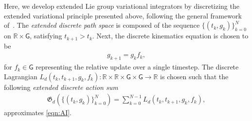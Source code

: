 \documentclass[letterpaper, 10pt, conference]{ieeeconf}
\newcommand{\G}{\ensuremath{\mathsf{G}}}
\renewcommand{\Re}{\ensuremath{\mathbb{R}}}
\begin{document}
Here, we develop extended Lie group variational integrators by discretizing the extended variational principle presented above, following the general framework of~\cite{MarWesAN01}.
The \textit{extended discrete path space} is composed of the sequence $\{(t_k, g_k)\}_{k=0}^N$ on $\Re\times\G$, satisfying $t_{k+1}>t_k$.
Next, the discrete kinematics equation is chosen to be
\begin{align}
    g_{k+1} = g_k f_k, \label{eqn:gkp}
\end{align}
for $f_k \in\G$ representing the relative update over a single timestep. 
The discrete Lagrangian $L_d(t_k, t_{k+1}, g_k, f_k): \Re\times\Re\times\G\times\G\rightarrow \Re$ is chosen such that the following \textit{extended discrete action sum}
\begin{align}
    \mathfrak{G}_d(\{(t_k, g_k)\}_{k=0}^N) = \sum_{k=0}^{N-1} L_d(t_k, t_{k+1}, g_k, f_k), \label{eqn:Gd}
\end{align}
approximates \eqref{eqn:AI}. 
\end{document}
